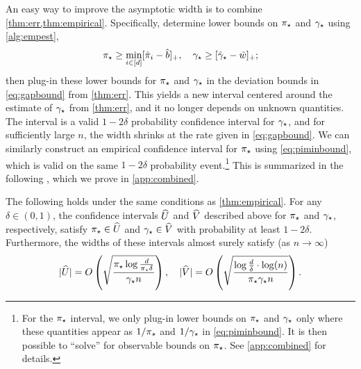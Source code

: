 An easy way to improve the asymptotic width is to combine
\cref{thm:err,thm:empirical}.
Specifically, determine lower bounds on $\pi_{\star}$ and $\gamma_{\star}$ using
\cref{alg:empest},
\[
  \pi_{\star} \geq \min_{i \in [d]} [ \hat\pi_i - \hat{b} ]_+
  , \quad
  \gamma_{\star} \geq [ \hat\gamma_{\star} - \hat{w} ]_+
  ;
\]
then plug-in these lower bounds for $\pi_{\star}$ and $\gamma_{\star}$ in the
deviation bounds in \cref{eq:gapbound} from \cref{thm:err}.
This yields a new interval centered around the estimate of $\gamma_{\star}$ from
\cref{thm:err}, and it no longer depends on unknown quantities.
The interval is a valid $1-2\delta$ probability confidence interval
for $\gamma_{\star}$, and for sufficiently large $n$, the width shrinks at the
rate given in \cref{eq:gapbound}.
We can similarly construct an empirical confidence interval for
$\pi_{\star}$ using \cref{eq:piminbound}, which is valid on the same
$1-2\delta$ probability event.\footnote{%
  For the $\pi_{\star}$ interval, we only plug-in lower bounds on $\pi_{\star}$
  and $\gamma_{\star}$ only where these quantities appear as $1/\pi_{\star}$ and
  $1/\gamma_{\star}$ in \cref{eq:piminbound}.
  It is then possible to ``solve'' for observable bounds on $\pi_{\star}$.
  See \cref{app:combined} for details.%
}
This is summarized in the following , which
we prove in \cref{app:combined}.
\begin{theorem}
  \label{thm:combined}
  The following holds under the same conditions as
  \cref{thm:empirical}.
  For any $\delta \in (0,1)$, the confidence intervals $\widehat{U}$ and
  $\widehat{V}$ described above for $\pi_{\star}$ and $\gamma_{\star}$, respectively,
  satisfy $\pi_{\star} \in \widehat{U}$ and $\gamma_{\star} \in \widehat{V}$ with probability
  at least $1-2\delta$.
  Furthermore, the widths of these intervals almost surely satisfy
  (as $n \to \infty$) 
  \[
    |\widehat{U}|
    =
    O\left(
      \sqrt{\frac{\pi_{\star}\log\frac{d}{\pi_{\star}\delta}}{\gamma_{\star} n}}
    \right)
    ,
    \quad
    |\widehat{V}|
    =
    O\left(
      \sqrt{\frac{\log\frac{d}{\delta}\cdot\log(n)}{\pi_{\star}\gamma_{\star} n}}
    \right)
    .
  \]
\end{theorem}


%


